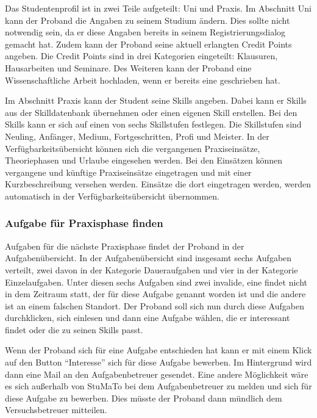 \documentclass[
  12pt,
  ngerman,
  a4paper,
]{article}
\begin{document}
Das Studentenprofil ist in zwei Teile aufgeteilt: Uni und Praxis. Im
Abschnitt Uni kann der Proband die Angaben zu seinem Studium ändern.
Dies sollte nicht notwendig sein, da er diese Angaben bereits in seinem
Registrierungsdialog gemacht hat. Zudem kann der Proband seine aktuell
erlangten Credit Points angeben. Die Credit Points sind in drei
Kategorien eingeteilt: Klausuren, Hausarbeiten und Seminare. Des
Weiteren kann der Proband eine Wissenschaftliche Arbeit hochladen, wenn
er bereits eine geschrieben hat.

Im Abschnitt Praxis kann der Student seine Skills angeben. Dabei kann er
Skills aus der Skilldatenbank übernehmen oder einen eigenen Skill
erstellen. Bei den Skills kann er sich auf einen von sechs Skillstufen
festlegen. Die Skillstufen sind Neuling, Anfänger, Medium,
Fortgeschritten, Profi und Meister. In der Verfügbarkeitsübersicht
können sich die vergangenen Praxiseinsätze, Theoriephasen und Urlaube
eingesehen werden. Bei den Einsätzen können vergangene und künftige
Praxiseinsätze eingetragen und mit einer Kurzbeschreibung versehen
werden. Einsätze die dort eingetragen werden, werden automatisch in der
Verfügbarkeitsübersicht übernommen.

\hypertarget{aufgabe-fuxfcr-praxisphase-finden}{%
\subsubsection{Aufgabe für Praxisphase
finden}\label{aufgabe-fuxfcr-praxisphase-finden}}

Aufgaben für die nächste Praxisphase findet der Proband in der
Aufgabenübersicht. In der Aufgabenübersicht sind insgesamt sechs
Aufgaben verteilt, zwei davon in der Kategorie Daueraufgaben und vier in
der Kategorie Einzelaufgaben. Unter diesen sechs Aufgaben sind zwei
invalide, eine findet nicht in dem Zeitraum statt, der für diese Aufgabe
genannt worden ist und die andere ist an einem falschen Standort. Der
Proband soll sich nun durch diese Aufgaben durchklicken, sich einlesen
und dann eine Aufgabe wählen, die er interessant findet oder die zu
seinen Skills passt.

Wenn der Proband sich für eine Aufgabe entschieden hat kann er mit einem
Klick auf den Button ``Interesse'' sich für diese Aufgabe bewerben. Im
Hintergrund wird dann eine Mail an den Aufgabenbetreuer gesendet. Eine
andere Möglichkeit wäre es sich außerhalb von StuMaTo bei dem
Aufgabenbetreuer zu melden und sich für diese Aufgabe zu bewerben. Dies
müsste der Proband dann mündlich dem Versuchsbetreuer mitteilen.
\end{document}
